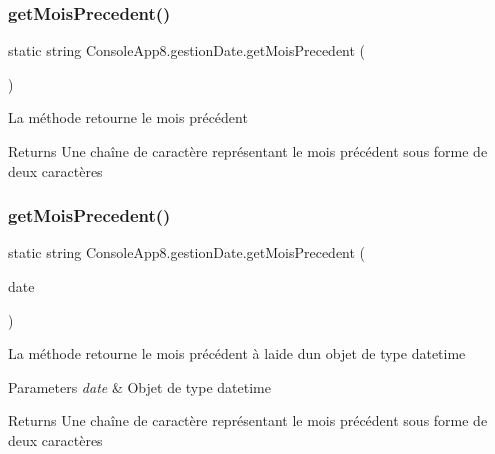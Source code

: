 \subsubsection{\texorpdfstring{get\+Mois\+Precedent()}{getMoisPrecedent()}\hspace{0.1cm}{\footnotesize\ttfamily [1/2]}}
{\footnotesize\ttfamily static string Console\+App8.\+gestion\+Date.\+get\+Mois\+Precedent (\begin{DoxyParamCaption}{ }\end{DoxyParamCaption})\hspace{0.3cm}{\ttfamily [static]}}



La méthode retourne le mois précédent 

\begin{DoxyReturn}{Returns}
Une chaîne de caractère représentant le mois précédent sous forme de deux caractères
\end{DoxyReturn}
\mbox{\label{class_console_app8_1_1gestion_date_a5aca6ea8abeee381e9ec5509e4e0459a}} 
\subsubsection{\texorpdfstring{get\+Mois\+Precedent()}{getMoisPrecedent()}\hspace{0.1cm}{\footnotesize\ttfamily [2/2]}}
{\footnotesize\ttfamily static string Console\+App8.\+gestion\+Date.\+get\+Mois\+Precedent (\begin{DoxyParamCaption}\item[{Date\+Time}]{date }\end{DoxyParamCaption})\hspace{0.3cm}{\ttfamily [static]}}



La méthode retourne le mois précédent à l\textquotesingle{}aide d\textquotesingle{}un objet de type datetime 


\begin{DoxyParams}{Parameters}
{\em date} & Objet de type datetime\\
\hline
\end{DoxyParams}
\begin{DoxyReturn}{Returns}
Une chaîne de caractère représentant le mois précédent sous forme de deux caractères
\end{DoxyReturn}
\mbox{\label{class_console_app8_1_1gestion_date_a24f475093dcb36eecbe639a9484066f8}} 
